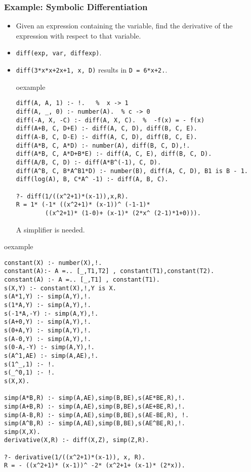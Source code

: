 \begin{frame}[fragile]
\frametitle{Example: Symbolic Differentiation}
\small
\begin{itemize}
\item Given an expression containing the variable, find the derivative
of the expression with respect to that variable.
\item \lstinline!diff(exp, var, diffexp)!.
\item \lstinline!diff(3*x*x+2x+1, x, D)! results in
\lstinline!D = 6*x+2.!.\\
\begin{beamercolorbox}{oexample}
\begin{lstlisting}[basicstyle=\scriptsize\ttfamily]
diff(A, A, 1) :- !.   %  x -> 1
diff(A, _, 0) :- number(A).  % c -> 0 
diff(-A, X, -C) :- diff(A, X, C).  %  -f(x) = - f(x)
diff(A+B, C, D+E) :- diff(A, C, D), diff(B, C, E).
diff(A-B, C, D-E) :- diff(A, C, D), diff(B, C, E).
diff(A*B, C, A*D) :- number(A), diff(B, C, D),!.
diff(A*B, C, A*D+B*E) :- diff(A, C, E), diff(B, C, D).
diff(A/B, C, D) :- diff(A*B^(-1), C, D).
diff(A^B, C, B*A^B1*D) :- number(B), diff(A, C, D), B1 is B - 1.
diff(log(A), B, C*A^ -1) :- diff(A, B, C).

?- diff(1/((x^2+1)*(x-1)),x,R).
R = 1* (-1* ((x^2+1)* (x-1))^ (-1-1)* 
        ((x^2+1)* (1-0)+ (x-1)* (2*x^ (2-1)*1+0))).
\end{lstlisting}
\end{beamercolorbox}
A simplifier is needed.
\end{itemize}
\end{frame}

\begin{frame}[fragile]
\small
\begin{beamercolorbox}{oexample}
\begin{lstlisting}[basicstyle=\scriptsize\ttfamily]
constant(X) :- number(X),!.
constant(A):- A =.. [_,T1,T2] , constant(T1),constant(T2).
constant(A) :- A =.. [_,T1] , constant(T1).
s(X,Y) :- constant(X),!,Y is X.
s(A*1,Y) :- simp(A,Y),!.
s(1*A,Y) :- simp(A,Y),!.
s(-1*A,-Y) :- simp(A,Y),!.
s(A+0,Y) :- simp(A,Y),!.
s(0+A,Y) :- simp(A,Y),!.
s(A-0,Y) :- simp(A,Y),!.
s(0-A,-Y) :- simp(A,Y),!.
s(A^1,AE) :- simp(A,AE),!.
s(1^_,1) :- !.
s(_^0,1) :- !.
s(X,X).

simp(A*B,R) :- simp(A,AE),simp(B,BE),s(AE*BE,R),!.
simp(A+B,R) :- simp(A,AE),simp(B,BE),s(AE+BE,R),!.
simp(A-B,R) :- simp(A,AE),simp(B,BE),s(AE-BE,R), !.
simp(A^B,R) :- simp(A,AE),simp(B,BE),s(AE^BE,R),!.
simp(X,X).
derivative(X,R) :- diff(X,Z), simp(Z,R).

?- derivative(1/((x^2+1)*(x-1)), x, R).
R = - ((x^2+1)* (x-1))^ -2* (x^2+1+ (x-1)* (2*x)).
\end{lstlisting}
\end{beamercolorbox}
\end{frame}

